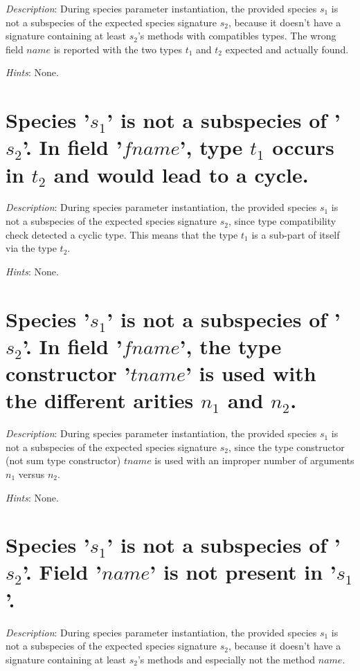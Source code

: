 {\em Description}: During species parameter instantiation, the
provided species $s_1$ is not a subspecies of the expected species
signature $s_2$, because it doesn't have a signature containing at
least $s_2$'s methods with compatibles types. The wrong field $name$
is reported with the two types $t_1$ and $t_2$ expected and actually
found.

{\em Hints}: None.



\section*{Species '$s_1$' is not a subspecies of '$s_2$'. In field
  '$fname$', type $t_1$ occurs in $t_2$ and would lead to a cycle.}

{\em Description}: During species parameter instantiation, the
provided species $s_1$ is not a subspecies of the expected species
signature $s_2$, since type compatibility check detected a cyclic
type. This means that the type $t_1$ is a sub-part of itself via the
type $t_2$.

{\em Hints}: None.



\section*{Species '$s_1$' is not a subspecies of '$s_2$'. In field
  '$fname$', the type constructor '$tname$' is used with the different
  arities $n_1$ and $n_2$.}

{\em Description}: During species parameter instantiation, the
provided species $s_1$ is not a subspecies of the expected species
signature $s_2$, since the type constructor (not sum type constructor)
$tname$ is used with an improper number of arguments $n_1$ versus
$n_2$.

{\em Hints}: None.



\section*{Species '$s_1$' is not a subspecies of '$s_2$'. Field '$name$'
  is not present in '$s_1$'.}

{\em Description}: During species parameter instantiation, the
provided species $s_1$ is not a subspecies of the expected species
signature $s_2$, because it doesn't have a signature containing at
least $s_2$'s methods and especially not the method $name$.

